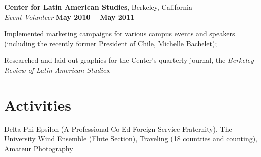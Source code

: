 \documentclass[margin,line]{resume}
\begin{document}
\begin{resume}
	\textbf{Center for Latin American Studies}, Berkeley, California \vspace{1mm}\\\vspace{0mm}%
    \textsl{Event Volunteer} \hfill \textbf{May 2010 -- May 2011}\vspace{0mm}\vspace{0mm}%
	\begin{list2}
		\item Implemented marketing campaigns for various campus events and speakers (including the recently former President
	of Chile, Michelle Bachelet); 
		\item Researched and laid-out graphics for the Center's quarterly journal, the \emph{Berkeley Review of
	Latin American Studies}. 
	\end{list2}

	\section{\mysidestyle Activities}

	Delta Phi Epsilon (A Professional Co-Ed Foreign Service Fraternity), The University Wind Ensemble (Flute
	Section), Traveling (18 countries and counting), Amateur Photography


\end{resume}
\end{document}
